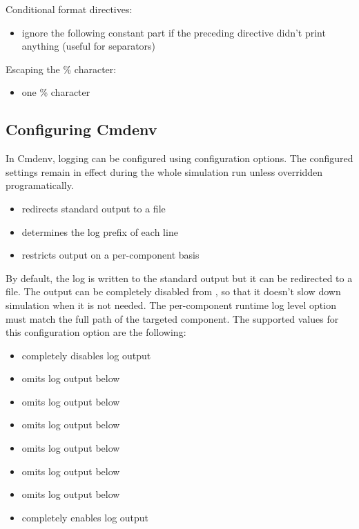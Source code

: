 Conditional format directives:
\begin{itemize}
  \item {} ignore the following constant part if the preceding directive didn't print anything (useful for separators)
\end{itemize}

Escaping the \% character:
\begin{itemize}
  \item \ttt{\%\%} one \% character
\end{itemize}

\subsection{Configuring Cmdenv}
\label{sec:config-sim:configuring-cmdenv}

In Cmdenv, logging can be configured using  configuration
options. The configured settings remain in effect during the whole simulation run
unless overridden programatically.

\begin{itemize}
  \item {} redirects standard output to a file
  \item {} determines the log prefix of each line
  \item {} restricts output on a per-component basis
\end{itemize}

By default, the log is written to the standard output but it can be redirected to
a file. The output can be completely disabled from , so
that it doesn't slow down simulation when it is not needed. The per-component
runtime log level option must match the full path of the targeted component. The
supported values for this configuration option are the following:

\begin{itemize}
  \item {} completely disables log output
  \item {} omits log output below 
  \item {} omits log output below 
  \item {} omits log output below 
  \item {} omits log output below 
  \item {} omits log output below 
  \item {} omits log output below 
  \item {} completely enables log output
\end{itemize}

